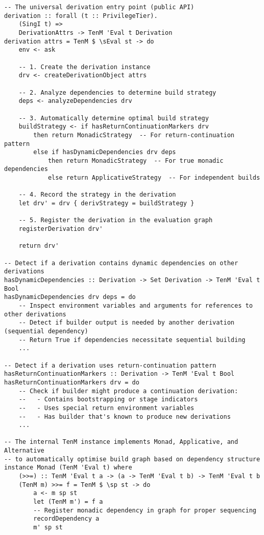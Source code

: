 \documentclass{article}
\begin{document}
\begin{tcolorbox}[title=Core DSL Implementation]
\begin{verbatim}
-- The universal derivation entry point (public API)
derivation :: forall (t :: PrivilegeTier).
    (SingI t) =>
    DerivationAttrs -> TenM 'Eval t Derivation
derivation attrs = TenM $ \sEval st -> do
    env <- ask

    -- 1. Create the derivation instance
    drv <- createDerivationObject attrs

    -- 2. Analyze dependencies to determine build strategy
    deps <- analyzeDependencies drv

    -- 3. Automatically determine optimal build strategy
    buildStrategy <- if hasReturnContinuationMarkers drv
        then return MonadicStrategy  -- For return-continuation pattern
        else if hasDynamicDependencies drv deps
            then return MonadicStrategy  -- For true monadic dependencies
            else return ApplicativeStrategy  -- For independent builds

    -- 4. Record the strategy in the derivation
    let drv' = drv { derivStrategy = buildStrategy }

    -- 5. Register the derivation in the evaluation graph
    registerDerivation drv'

    return drv'

-- Detect if a derivation contains dynamic dependencies on other derivations
hasDynamicDependencies :: Derivation -> Set Derivation -> TenM 'Eval t Bool
hasDynamicDependencies drv deps = do
    -- Inspect environment variables and arguments for references to other derivations
    -- Detect if builder output is needed by another derivation (sequential dependency)
    -- Return True if dependencies necessitate sequential building
    ...

-- Detect if a derivation uses return-continuation pattern
hasReturnContinuationMarkers :: Derivation -> TenM 'Eval t Bool
hasReturnContinuationMarkers drv = do
    -- Check if builder might produce a continuation derivation:
    --   - Contains bootstrapping or stage indicators
    --   - Uses special return environment variables
    --   - Has builder that's known to produce new derivations
    ...

-- The internal TenM instance implements Monad, Applicative, and Alternative
-- to automatically optimise build graph based on dependency structure
instance Monad (TenM 'Eval t) where
    (>>=) :: TenM 'Eval t a -> (a -> TenM 'Eval t b) -> TenM 'Eval t b
    (TenM m) >>= f = TenM $ \sp st -> do
        a <- m sp st
        let (TenM m') = f a
        -- Register monadic dependency in graph for proper sequencing
        recordDependency a
        m' sp st


\end{verbatim}
\end{tcolorbox}
\end{document}
